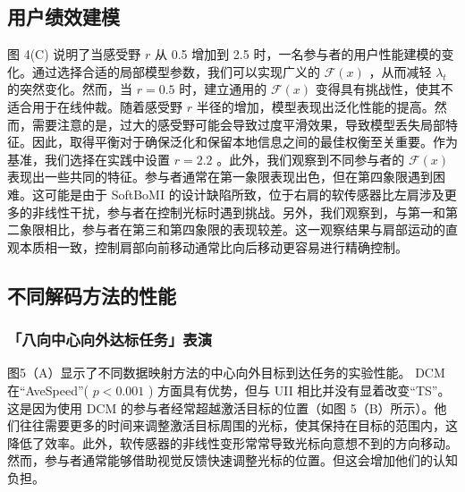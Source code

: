 \subsection{用户绩效建模  }    图 4(C) 说明了当感受野    $r$    从 0.5 增加到 2.5 时，一名参与者的用户性能建模的变化。通过选择合适的局部模型参数，我们可以实现广义的    $\mathcal{F}(x)$    ，从而减轻    $\lambda_t$    的突然变化。然而，当    $r=0.5$    时，建立通用的    $\mathcal{F}(x)$    变得具有挑战性，使其不适合用于在线仲裁。随着感受野    $r$    半径的增加，模型表现出泛化性能的提高。然而，需要注意的是，过大的感受野可能会导致过度平滑效果，导致模型丢失局部特征。因此，取得平衡对于确保泛化和保留本地信息之间的最佳权衡至关重要。作为基准，我们选择在实践中设置    $r=2.2$   。此外，我们观察到不同参与者的    $\mathcal{F}(x)$    表现出一些共同的特征。参与者通常在第一象限表现出色，但在第四象限遇到困难。这可能是由于 SoftBoMI 的设计缺陷所致，位于右肩的软传感器比左肩涉及更多的非线性干扰，参与者在控制光标时遇到挑战。另外，我们观察到，与第一和第二象限相比，参与者在第三和第四象限的表现较差。这一观察结果与肩部运动的直观本质相一致，控制肩部向前移动通常比向后移动更容易进行精确控制。  

\subsection{不同解码方法的性能  }     


\subsubsection{「八向中心向外达标任务」表演  }    图5（A）显示了不同数据映射方法的中心向外目标到达任务的实验性能。 DCM 在“AveSpeed”(    $p<0.001$    ) 方面具有优势，但与 UII 相比并没有显着改变“TS”。这是因为使用 DCM 的参与者经常超越激活目标的位置（如图 5（B）所示）。他们往往需要更多的时间来调整激活目标周围的光标，使其保持在目标的范围内，这降低了效率。此外，软传感器的非线性变形常常导致光标向意想不到的方向移动。然而，参与者通常能够借助视觉反馈快速调整光标的位置。但这会增加他们的认知负担。  

